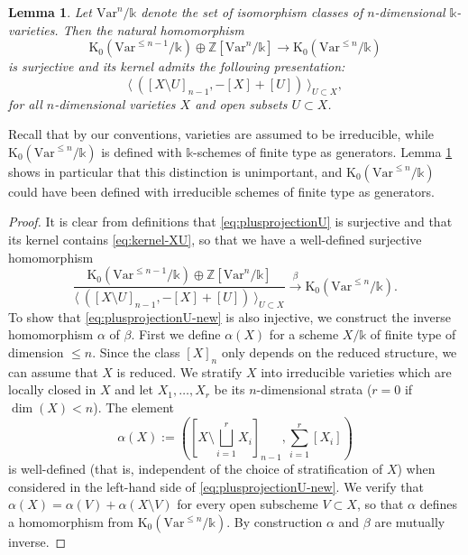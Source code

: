 \documentclass[a4paper,12pt]{amsart}
\def\k{\mathbb k}
\def\Z{\mathbb Z}
\def\Kt{{\mathrm{K}}}
\def\Var{{\mathrm{Var}}}
\theoremstyle{plain}
\newtheorem{lemma}[dummy]{Lemma}
\numberwithin{equation}{section}
\theoremstyle{definition}
\newcommand{\gb}{\beta}
\renewcommand{\(}{\left(}
\renewcommand{\)}{\right)}
\begin{document}
\begin{lemma}\label{lem:kernelXU}
Let $\Var^n/\k$ denote the set of isomorphism
classes of $n$-dimensional $\k$-varieties.
Then the natural homomorphism 
\begin{equation}\label{eq:plusprojectionU}
\Kt_0(\Var^{\le n-1}/\k) \oplus \Z[\Var^n/\k] \to \Kt_0(\Var^{\le n}/\k)
\end{equation}
is surjective and its kernel
admits the following presentation:
\begin{equation}\label{eq:kernel-XU}
\langle \ \left( [X \setminus U]_{n-1}, 
- [X] + [U] \right) \ \rangle_{U \subset X},
\end{equation}
for all $n$-dimensional
varieties $X$
and open subsets $U \subset X$. 
\end{lemma}

Recall that by our conventions, varieties are assumed
to be irreducible, while
$\Kt_0(\Var^{\le n}/\k)$
is defined with $\k$-schemes of finite type as generators. Lemma
\ref{lem:kernelXU} shows in particular that this distinction
is unimportant, and $\Kt_0(\Var^{\le n}/\k)$
could have been defined with irreducible schemes
of finite type as generators.

\begin{proof}
It is clear from definitions that 
\eqref{eq:plusprojectionU}
is surjective and that
its kernel contains
\eqref{eq:kernel-XU},
so that we have a well-defined surjective homomorphism
\begin{equation}\label{eq:plusprojectionU-new}
\frac{\Kt_0(\Var^{\le n-1}/\k) \oplus \Z[\Var^n/\k]}{\langle \ \left( [X \setminus U]_{n-1}, 
- [X] + [U] \right) \ \rangle_{U \subset X}} 
\overset{\beta}\longrightarrow 
\Kt_0(\Var^{\le n}/\k).
\end{equation}
To show that \eqref{eq:plusprojectionU-new} is also
injective,
we construct the inverse homomorphism $\alpha$ of $\gb$.
First we define $\alpha(X)$ for a scheme $X/\k$
of finite type of dimension $\le n$. 
Since the class $[X]_n$ only depends on the reduced structure,
we can assume that $X$ is reduced.
We stratify $X$ into 
irreducible varieties which are locally closed in $X$ and
let $X_1, \dots, X_r$
be its $n$-dimensional strata
($r = 0$ if $\dim(X) < n$).
The element
\[
\alpha(X) := 
\left([X \setminus \bigsqcup_{i=1}^r X_i ]_{n-1}, \sum_{i=1}^r [X_i]\right) 
\]
is well-defined 
(that is, independent of the choice of stratification of $X$) 
when
considered in the left-hand side of \eqref{eq:plusprojectionU-new}.
We verify that 
$\alpha(X) = \alpha(V) + \alpha(X\setminus V)$
for every open subscheme $V \subset X$, so
that $\alpha$ defines a homomorphism
from $\Kt_0(\Var^{\le n}/\k)$.
By construction $\alpha$ and $\beta$ are mutually inverse.
\end{proof}
\end{document}
